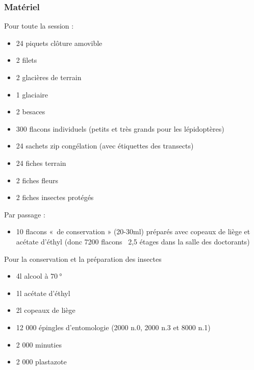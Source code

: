 \documentclass{article}
\begin{document}
	\subsubsection{Matériel}
	Pour toute la session :
	\begin{itemize}
		\item 24 piquets clôture amovible 
		\item 2 filets
		\item 2 glacières de terrain
		\item 1 glaciaire
		\item 2 besaces
		\item 300 flacons individuels (petits et très grands pour les lépidoptères)
		\item 24 sachets zip congélation (avec étiquettes des transects)
		\item 24 fiches terrain
		\item 2 fiches fleurs
		\item 2 fiches insectes protégés
	\end{itemize}
	Par passage :
	\begin{itemize}
		\item 10 flacons « de conservation » (20-30ml) préparés  avec copeaux de liège et acétate d’éthyl (donc 7200 flacons ~2,5 étages dans la salle des doctorants)
	\end{itemize}
	Pour la conservation et la préparation des insectes
	\begin{itemize}
		\item 4l alcool à $\SI{70}{\degree}$
		\item 1l acétate d'éthyl
		\item 2l copeaux de liège
		\item 12 000 épingles d'entomologie (2000 n.0, 2000 n.3 et 8000 n.1) 
		\item 2 000 minuties
		\item 2 000 plastazote
	\end{itemize}
\end{document}
